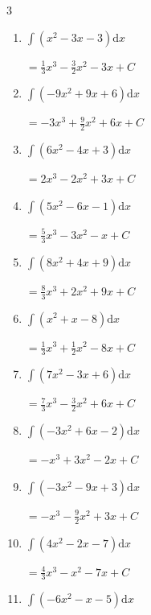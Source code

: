 \begin{multicols}{3}
\begin{enumerate}
  \item $\displaystyle \int \left( x^{2}-3x-3 \right) \mathrm{d}x$

        $\displaystyle =\frac{1}{3}x^{3}-\frac{3}{2}x^{2}-3x+ C$

  \item $\displaystyle \int \left( -9x^{2}+9x+6 \right) \mathrm{d}x$

        $\displaystyle =-3x^{3}+\frac{9}{2}x^{2}+6x+ C$

  \item $\displaystyle \int \left( 6x^{2}-4x+3 \right) \mathrm{d}x$

        $\displaystyle =2x^{3}-2x^{2}+3x+ C$

  \item $\displaystyle \int \left( 5x^{2}-6x-1 \right) \mathrm{d}x$

        $\displaystyle =\frac{5}{3}x^{3}-3x^{2}-x+ C$

  \item $\displaystyle \int \left( 8x^{2}+4x+9 \right) \mathrm{d}x$

        $\displaystyle =\frac{8}{3}x^{3}+2x^{2}+9x+ C$

  \item $\displaystyle \int \left( x^{2}+x-8 \right) \mathrm{d}x$

        $\displaystyle =\frac{1}{3}x^{3}+\frac{1}{2}x^{2}-8x+ C$

\columnbreak %

  \item $\displaystyle \int \left( 7x^{2}-3x+6 \right) \mathrm{d}x$

        $\displaystyle =\frac{7}{3}x^{3}-\frac{3}{2}x^{2}+6x+ C$

  \item $\displaystyle \int \left( -3x^{2}+6x-2 \right) \mathrm{d}x$

        $\displaystyle =-x^{3}+3x^{2}-2x+ C$

  \item $\displaystyle \int \left( -3x^{2}-9x+3 \right) \mathrm{d}x$

        $\displaystyle =-x^{3}-\frac{9}{2}x^{2}+3x+ C$

  \item $\displaystyle \int \left( 4x^{2}-2x-7 \right) \mathrm{d}x$

        $\displaystyle =\frac{4}{3}x^{3}-x^{2}-7x+ C$

  \item $\displaystyle \int \left( -6x^{2}-x-5 \right) \mathrm{d}x$


\end{enumerate}
\end{multicols}
